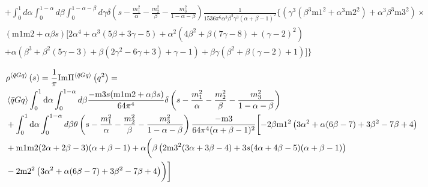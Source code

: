 \documentclass[prd,showpacs,showkeys,floatfix,amsmath,amssymb,floatfix,english]{revtex4}
\begin{document}
{\begin{align}
 & +\int_{0}^{1}d\alpha\int_{0}^{1-\alpha}d\beta\int_{0}^{1-\alpha-\beta}d\gamma\delta\left(s-\frac{m_{1}^{2}}{\alpha}-\frac{m_{2}^{2}}{\beta}-\frac{m_{3}^{2}}{1-\alpha-\beta}\right)\frac{1}{1536\pi^{6}\alpha^{3}\beta^{3}\gamma^{3}(\alpha+\beta-1)^{2}}\biggl\{\left(\gamma^{3}\left(\beta^{3}\text{m1}^{2}+\alpha^{3}\text{m2}^{2}\right)+\alpha^{3}\beta^{3}\text{m3}^{2}\right)\times\nonumber \\
 & \left(\text{m1}\text{m2}+\alpha\beta s\right)\biggl[2\alpha^{4}+\alpha^{3}(5\beta+3\gamma-5)+\alpha^{2}\left(4\beta^{2}+\beta(7\gamma-8)+(\gamma-2)^{2}\right)\nonumber \\
 & +\alpha\left(\beta^{3}+\beta^{2}(5\gamma-3)+\beta\left(2\gamma^{2}-6\gamma+3\right)+\gamma-1\right)+\beta\gamma\left(\beta^{2}+\beta(\gamma-2)+1\right)\biggr]\biggr\}
\end{align}
}{\tiny \par}

{\scriptsize{}
\begin{align}
 & \rho^{\left\langle \bar{q}Gq\right\rangle }\left(s\right)=\frac{1}{\pi}\mathrm{Im}\Pi^{\left\langle \bar{q}Gq\right\rangle }\left(q^{2}\right)=\nonumber \\
 & \left\langle \bar{q}Gq\right\rangle \int_{0}^{1}{\rm d}\alpha\int_{0}^{1-\alpha}d\beta\frac{-\text{m3}s(\text{m1}\text{m2}+\alpha\beta s)}{64\pi^{4}}\delta\left(s-\frac{m_{1}^{2}}{\alpha}-\frac{m_{2}^{2}}{\beta}-\frac{m_{3}^{2}}{1-\alpha-\beta}\right)\nonumber \\
 & +\int_{0}^{1}{\rm d}\alpha\int_{0}^{1-\alpha}d\beta\theta\left(s-\frac{m_{1}^{2}}{\alpha}-\frac{m_{2}^{2}}{\beta}-\frac{m_{3}^{2}}{1-\alpha-\beta}\right)\frac{-\text{m3}}{64\pi^{4}(\alpha+\beta-1)^{2}}\biggl[-2\beta\text{m1}^{2}\left(3\alpha^{2}+\alpha(6\beta-7)+3\beta^{2}-7\beta+4\right)\nonumber \\
 & +\text{m1}\text{m2}(2\alpha+2\beta-3)(\alpha+\beta-1)+\alpha\biggl(\beta\left(2\text{m3}^{2}(3\alpha+3\beta-4)+3s(4\alpha+4\beta-5)(\alpha+\beta-1)\right)\nonumber \\
 & -2\text{m2}^{2}\left(3\alpha^{2}+\alpha(6\beta-7)+3\beta^{2}-7\beta+4\right)\biggr)\biggr]
\end{align}
}{\scriptsize \par}
\end{document}
